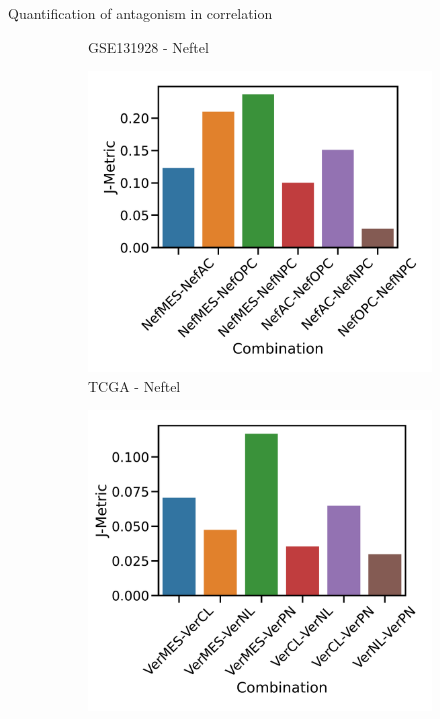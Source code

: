\documentclass[aspectratio=169,9pt]{beamer}
\begin{document}
\begin{frame}{Quantification of antagonism in correlation}
\begin{adjustwidth}{-5cm}{-5cm}
\begin{figure}
\begin{subfigure}[c]{0.27\textwidth}
                    \caption{GSE131928 - Neftel}
                \end{subfigure}
                \begin{subfigure}[c]{0.27\textwidth}
                    \centering
                    \includegraphics[width=\textwidth]{TCGA_Consistency_Nef}
                    \caption{TCGA - Neftel}
                \end{subfigure}
                \pause
                \begin{subfigure}[c]{0.27\textwidth}
                    \centering
                    \includegraphics[width=\textwidth]{GSM3828672_Consistency_Ver}

\end{subfigure}
\end{figure}
\end{adjustwidth}
\end{frame}
\end{document}
